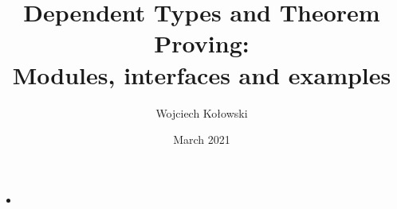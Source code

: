 \documentclass{beamer}
\title{Dependent Types and Theorem Proving: \\Modules, interfaces and examples}
\author{Wojciech Kołowski}
\date{March 2021}
\begin{document}
\frame{\titlepage}
\frame{\tableofcontents}
	
\begin{frame}{}
\begin{itemize}
	\item 
\end{itemize}
\end{frame}
\end{document}
